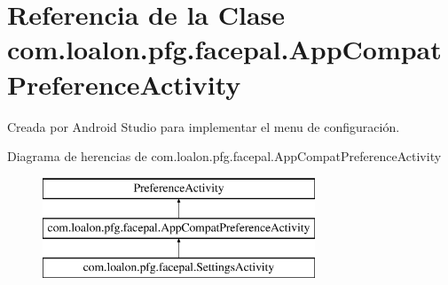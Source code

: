 \hypertarget{classcom_1_1loalon_1_1pfg_1_1facepal_1_1_app_compat_preference_activity}{}\section{Referencia de la Clase com.\+loalon.\+pfg.\+facepal.\+App\+Compat\+Preference\+Activity}
\label{classcom_1_1loalon_1_1pfg_1_1facepal_1_1_app_compat_preference_activity}


Creada por Android Studio para implementar el menu de configuración.  


Diagrama de herencias de com.\+loalon.\+pfg.\+facepal.\+App\+Compat\+Preference\+Activity\begin{figure}[H]
\begin{center}
\leavevmode
\includegraphics[height=3.000000cm]{classcom_1_1loalon_1_1pfg_1_1facepal_1_1_app_compat_preference_activity}
\end{center}
\end{figure}
